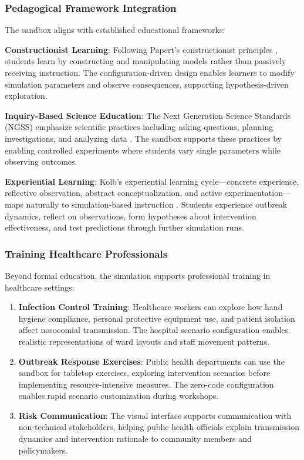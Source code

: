 \subsubsection{Pedagogical Framework Integration}

The sandbox aligns with established educational frameworks:

\textbf{Constructionist Learning}: Following Papert's constructionist principles \cite{papert1980mindstorms}, students learn by constructing and manipulating models rather than passively receiving instruction. The configuration-driven design enables learners to modify simulation parameters and observe consequences, supporting hypothesis-driven exploration.

\textbf{Inquiry-Based Science Education}: The Next Generation Science Standards (NGSS) emphasize scientific practices including asking questions, planning investigations, and analyzing data \cite{ngss2013next}. The sandbox supports these practices by enabling controlled experiments where students vary single parameters while observing outcomes.

\textbf{Experiential Learning}: Kolb's experiential learning cycle---concrete experience, reflective observation, abstract conceptualization, and active experimentation---maps naturally to simulation-based instruction \cite{kolb1984experiential}. Students experience outbreak dynamics, reflect on observations, form hypotheses about intervention effectiveness, and test predictions through further simulation runs.

\subsubsection{Training Healthcare Professionals}

Beyond formal education, the simulation supports professional training in healthcare settings:

\begin{enumerate}
    \item \textbf{Infection Control Training}: Healthcare workers can explore how hand hygiene compliance, personal protective equipment use, and patient isolation affect nosocomial transmission. The hospital scenario configuration enables realistic representations of ward layouts and staff movement patterns.
    
    \item \textbf{Outbreak Response Exercises}: Public health departments can use the sandbox for tabletop exercises, exploring intervention scenarios before implementing resource-intensive measures. The zero-code configuration enables rapid scenario customization during workshops.
    
    \item \textbf{Risk Communication}: The visual interface supports communication with non-technical stakeholders, helping public health officials explain transmission dynamics and intervention rationale to community members and policymakers.
\end{enumerate}

